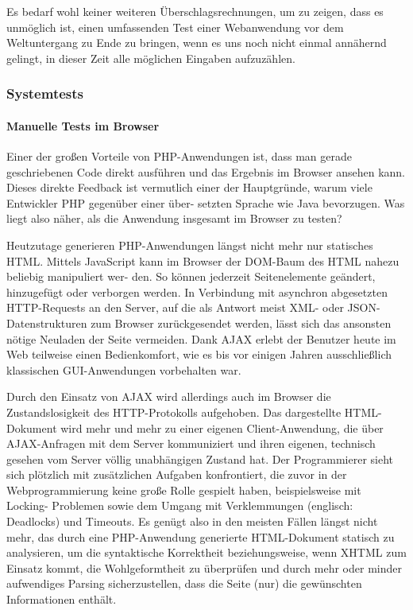 Es bedarf wohl keiner weiteren Überschlagsrechnungen, um zu zeigen, dass es unmöglich 
ist, einen umfassenden Test einer Webanwendung vor dem Weltuntergang zu Ende zu bringen, 
wenn es uns noch nicht einmal annähernd gelingt, in dieser Zeit alle möglichen
Eingaben aufzuzählen.

\subsubsection{Systemtests}
\paragraph{Manuelle Tests im Browser} %
Einer der großen Vorteile von PHP-Anwendungen ist, dass man gerade geschriebenen Code
direkt ausführen und das Ergebnis im Browser ansehen kann. Dieses direkte Feedback
ist vermutlich einer der Hauptgründe, warum viele Entwickler PHP gegenüber einer über-
setzten Sprache wie Java bevorzugen. Was liegt also näher, als die Anwendung insgesamt
im Browser zu testen?

Heutzutage generieren PHP-Anwendungen längst nicht mehr nur statisches HTML. Mittels
JavaScript kann im Browser der DOM-Baum des HTML nahezu beliebig manipuliert wer-
den. So können jederzeit Seitenelemente geändert, hinzugefügt oder verborgen werden.
In Verbindung mit asynchron abgesetzten HTTP-Requests an den Server, auf die als 
Antwort meist XML- oder JSON-Datenstrukturen zum Browser zurückgesendet werden, lässt
sich das ansonsten nötige Neuladen der Seite vermeiden. Dank AJAX erlebt der Benutzer
heute im Web teilweise einen Bedienkomfort, wie es bis vor einigen Jahren ausschließlich
klassischen GUI-Anwendungen vorbehalten war.

Durch den Einsatz von AJAX wird allerdings auch im Browser die Zustandslosigkeit des
HTTP-Protokolls aufgehoben. Das dargestellte HTML-Dokument wird mehr und mehr zu
einer eigenen Client-Anwendung, die über AJAX-Anfragen mit dem Server kommuniziert
und ihren eigenen, technisch gesehen vom Server völlig unabhängigen Zustand hat. Der
Programmierer sieht sich plötzlich mit zusätzlichen Aufgaben konfrontiert, die zuvor in
der Webprogrammierung keine große Rolle gespielt haben, beispielsweise mit Locking-
Problemen sowie dem Umgang mit Verklemmungen (englisch: Deadlocks) und Timeouts.
Es genügt also in den meisten Fällen längst nicht mehr, das durch eine PHP-Anwendung
generierte HTML-Dokument statisch zu analysieren, um die syntaktische Korrektheit 
beziehungsweise, wenn XHTML zum Einsatz kommt, die Wohlgeformtheit zu überprüfen
und durch mehr oder minder aufwendiges Parsing sicherzustellen, dass die Seite (nur) die
gewünschten Informationen enthält.

